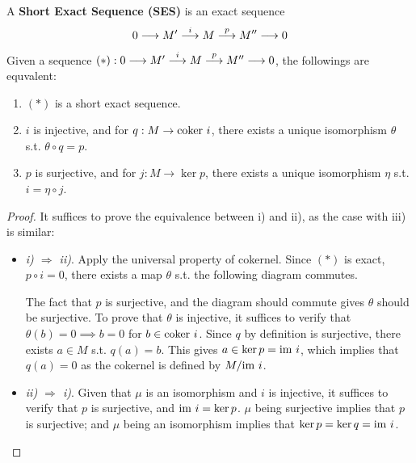 \documentclass{article}
\begin{document}
\begin{definition}
    A \textbf{Short Exact Sequence (SES)} is an exact sequence
    \[
        0 \longrightarrow M' \overset{i}{\longrightarrow} M \overset{p}{\longrightarrow} M'' \longrightarrow 0
    \]
\end{definition}

\begin{proposition}
    Given a sequence $(\ast): 0 \longrightarrow M' \overset{i}{\longrightarrow} M \overset{p}{\longrightarrow} M'' \longrightarrow 0$, the followings are equvalent:
    \begin{enumerate}[label=\roman*)]
        \item $(\ast)$ is a short exact sequence.
        \item $i$ is injective, and for $q: M \to \mathrm{coker}\  i$, there exists a unique isomorphism $\theta$ s.t. $\theta \circ q = p$.
        \item $p$ is surjective, and for $j: M \to \ker p$, there exists a unique isomorphism $\eta$ s.t. $i = \eta \circ j$.
    \end{enumerate}
\end{proposition}

\begin{proof}
    It suffices to prove the equivalence between i) and ii), as the case with iii) is similar:
    \begin{itemize}
        \item \emph{i) $\Rightarrow$ ii)}. Apply the universal property of cokernel. Since $(\ast)$ is exact, $p \circ i = 0$, there exists a map $\theta$ s.t. the following diagram commutes.
        \begin{figure}[htbp]
            \centering
        \end{figure}
        The fact that $p$ is surjective, and the diagram should commute gives $\theta$ should be surjective. To prove that $\theta$ is injective, it suffices to verify that $\theta(b) = 0 \implies b = 0$ for $b \in \mathrm{coker}\  i$. Since $q$ by definition is surjective, there exists $a \in M$ s.t. $q(a) = b$. This gives $a \in \ker p = \mathrm{im}\  i$, which implies that $q(a) = 0$ as the cokernel is defined by $M/ \mathrm{im}\  i$.
        \item \emph{ii) $\Rightarrow$ i)}. Given that $\mu$ is an isomorphism and $i$ is injective, it suffices to verify that $p$ is surjective, and $\mathrm{im}\  i = \ker p$. $\mu$ being surjective implies that $p$ is surjective; and $\mu$ being an isomorphism implies that $\ker p = \ker q = \mathrm{im}\  i$. 
    \end{itemize}
\end{proof}
\end{document}
